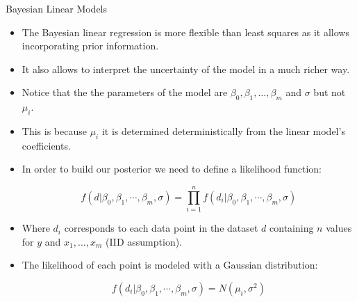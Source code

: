 \documentclass[handout]{beamer}
\begin{document}
\begin{frame}{Bayesian Linear Models}
\scriptsize{
\begin{itemize}


\item The Bayesian linear regression is  more flexible than least squares as it allows incorporating prior information.

\item It also allows to interpret the uncertainty of the model in a much richer way.

\item Notice that the the parameters of the model are $\beta_0,\beta_1,\dots,\beta_m$ and $\sigma$ but not $\mu_i$.

\item This is because $\mu_i$ it is determined deterministically from the linear model's coefficients.

\item In order to build our posterior we need to define a likelihood function:

\begin{displaymath}
 f(d|\beta_0,\beta_1,\cdots,\beta_m,\sigma) =\prod_{i=1}^n f(d_i|\beta_0,\beta_1,\cdots,\beta_m,\sigma) 
\end{displaymath}


\item Where $d_i$ corresponds to each data point in the dataset $d$ containing $n$ values for $y$ and $x_1,\dots,x_m$ (IID assumption).

\item The likelihood of each point is modeled with a Gaussian distribution:

\begin{displaymath}
 f(d_i|\beta_0,\beta_1,\cdots,\beta_m,\sigma)= N(\mu_i, \sigma^2)
\end{displaymath}



 
\end{itemize}



} 

\end{frame}
\end{document}
